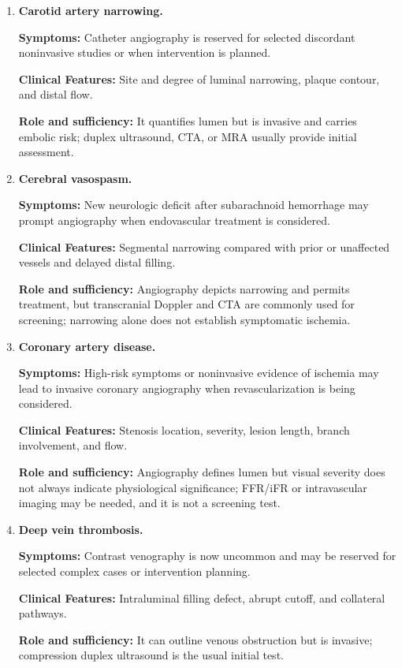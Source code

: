 \begin{enumerate}[leftmargin=*,itemsep=0.45em,topsep=0.4em]
\item \textbf{Carotid artery narrowing.}\par\noindent\textbf{Symptoms:} Catheter angiography is reserved for selected discordant noninvasive studies or when intervention is planned.\par\noindent\textbf{Clinical Features:} Site and degree of luminal narrowing, plaque contour, and distal flow.\par\noindent\textbf{Role and sufficiency:} It quantifies lumen but is invasive and carries embolic risk; duplex ultrasound, CTA, or MRA usually provide initial assessment.
\item \textbf{Cerebral vasospasm.}\par\noindent\textbf{Symptoms:} New neurologic deficit after subarachnoid hemorrhage may prompt angiography when endovascular treatment is considered.\par\noindent\textbf{Clinical Features:} Segmental narrowing compared with prior or unaffected vessels and delayed distal filling.\par\noindent\textbf{Role and sufficiency:} Angiography depicts narrowing and permits treatment, but transcranial Doppler and CTA are commonly used for screening; narrowing alone does not establish symptomatic ischemia.
\item \textbf{Coronary artery disease.}\par\noindent\textbf{Symptoms:} High-risk symptoms or noninvasive evidence of ischemia may lead to invasive coronary angiography when revascularization is being considered.\par\noindent\textbf{Clinical Features:} Stenosis location, severity, lesion length, branch involvement, and flow.\par\noindent\textbf{Role and sufficiency:} Angiography defines lumen but visual severity does not always indicate physiological significance; FFR/iFR or intravascular imaging may be needed, and it is not a screening test.
\item \textbf{Deep vein thrombosis.}\par\noindent\textbf{Symptoms:} Contrast venography is now uncommon and may be reserved for selected complex cases or intervention planning.\par\noindent\textbf{Clinical Features:} Intraluminal filling defect, abrupt cutoff, and collateral pathways.\par\noindent\textbf{Role and sufficiency:} It can outline venous obstruction but is invasive; compression duplex ultrasound is the usual initial test.

\end{enumerate}
